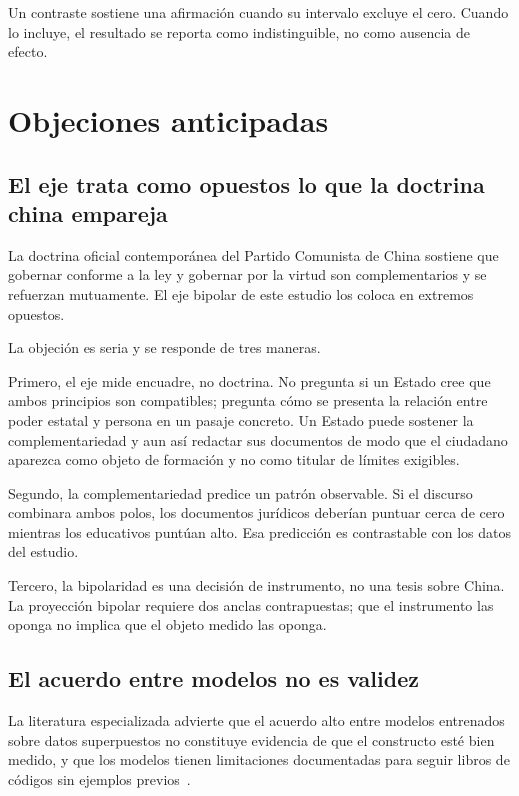\documentclass[12pt,letterpaper]{article}
\newcommand{\zhg}[1]{}
\begin{document}
Un contraste sostiene una afirmación cuando su intervalo excluye el cero. Cuando lo incluye, el resultado se reporta como indistinguible, no como ausencia de efecto.


\section{Objeciones anticipadas}

\subsection{El eje trata como opuestos lo que la doctrina china empareja}

La doctrina oficial contemporánea del Partido Comunista de China sostiene que gobernar conforme a la ley\zhg{依法治国} y gobernar por la virtud\zhg{以德治国} son complementarios y se refuerzan mutuamente. El eje bipolar de este estudio los coloca en extremos opuestos.

La objeción es seria y se responde de tres maneras.

Primero, el eje mide encuadre, no doctrina. No pregunta si un Estado cree que ambos principios son compatibles; pregunta cómo se presenta la relación entre poder estatal y persona en un pasaje concreto. Un Estado puede sostener la complementariedad y aun así redactar sus documentos de modo que el ciudadano aparezca como objeto de formación y no como titular de límites exigibles.

Segundo, la complementariedad predice un patrón observable. Si el discurso combinara ambos polos, los documentos jurídicos deberían puntuar cerca de cero mientras los educativos puntúan alto. Esa predicción es contrastable con los datos del estudio.

Tercero, la bipolaridad es una decisión de instrumento, no una tesis sobre China. La proyección bipolar requiere dos anclas contrapuestas; que el instrumento las oponga no implica que el objeto medido las oponga.

\subsection{El acuerdo entre modelos no es validez}

La literatura especializada advierte que el acuerdo alto entre modelos entrenados sobre datos superpuestos no constituye evidencia de que el constructo esté bien medido, y que los modelos tienen limitaciones documentadas para seguir libros de códigos sin ejemplos previos~\citep{halterman2025codebook}.
\end{document}
